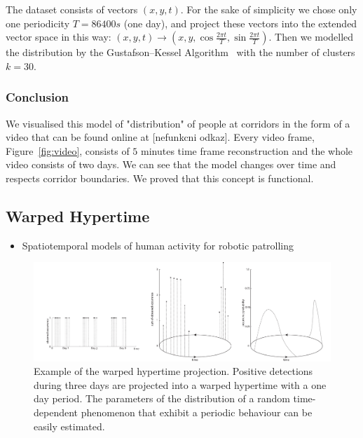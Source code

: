 The dataset consists of vectors $\left(x, y, t\right)$.
For the sake of simplicity we chose only one periodicity $T = 86400 s$ (one day), and project these vectors into the extended vector space in this way: $\left(x, y, t\right) \rightarrow \left(x, y, \cos\frac{2\pi t}{T}, \sin\frac{2\pi t}{T}\right)$.
Then we modelled the distribution by the Gustafson--Kessel Algorithm~\cite{gustafson1979fuzzy} with the number of clusters $k=30$.

\subsubsection{Conclusion}

We visualised this model of "distribution" of people at corridors in the form of a video that can be found online at [nefunkcni odkaz].
Every video frame, Figure~\ref{fig:video}, consists of $5$ minutes time frame reconstruction and the whole video consists of two days.
We can see that the model changes over time and respects corridor boundaries. 
We proved that this concept is functional.




\subsection{Warped Hypertime}

\begin{itemize}
    \item Spatiotemporal models of human activity for robotic patrolling
\end{itemize}

\begin{figure}[!b]
\begin{center}
    \includegraphics[width=1.0\columnwidth]{fig/hypertime_graph}
    \caption{Example of the warped hypertime projection. Positive detections during three days are projected into a warped hypertime with a one day period. The parameters of the distribution of a random time-dependent phenomenon that exhibit a periodic behaviour can be easily estimated.\label{fig:hypertime}}

\end{center}
\end{figure}



